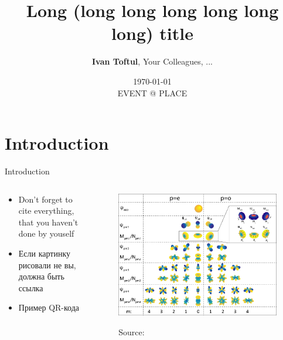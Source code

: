 \documentclass[
aspectratio=169,
16pt,
xcolor={dvipsnames} %
]{beamer}
\title[Short title]{\textbf{Long (long  long long long long long) title}}
\author[Ivan Toftul]{
	\textbf{Ivan Toftul}, 
	Your Colleagues, ...
}
\institute[ITMO]{
	Faculty of Physics, ITMO University \\ 
	\medskip
	\texttt{toftul.ivan@gmail.com} 
}
\date{
	\small{\today \\ EVENT @ PLACE}
}
\newcommand{\green}[1]{\textcolor{green!50!black}{#1}}
\begin{document}
	
\begin{frame}
	\titlepage 
\end{frame}

\section{Introduction}

\begin{frame}[t]{Introduction}
	\begin{columns}
		\begin{column}{0.4\linewidth}
			\begin{itemize}
				\item Don't forget to cite everything, that you haven't done by youself
				\item \green{Если картинку рисовали не вы, должна быть ссылка}
				\item Пример QR-кода 
			\end{itemize}
		\end{column}
		\begin{column}{0.6\linewidth}
			\begin{figure}
				\includegraphics[width=1.0\linewidth]{fig/harmonicscalibri0}
				{\raggedright\tiny Source:~\par}
			\end{figure}
		\end{column}
	\end{columns}
\end{frame}
\end{document}
